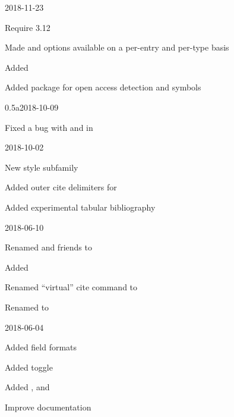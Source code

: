 \documentclass[DIV=9]{scrartcl}
\begin{document}
\begin{changelog}
\begin{release}{0.6}{2018-11-23}
  \item Require  3.12
  \item Made  and  options available on a
    per-entry and per-type basis
  \item Added 
  \item Added  package for open access detection and
    symbols
\end{release}
\begin{release}{0.5a}{2018-10-09}
  \item Fixed a bug with  and  in
\end{release}
\begin{release}{0.5}{2018-10-02}
  \item New  style
    subfamily
  \item Added outer cite delimiters for 
  \item Added experimental tabular bibliography
\end{release}
\begin{release}{0.4}{2018-06-10}
  \item Renamed  and friends to
  \item Added 
  \item Renamed \enquote{virtual} cite command  to
  \item Renamed  to 
\end{release}
\begin{release}{0.3}{2018-06-04}
  \item Added 
    field formats
  \item Added  toggle%
  \item Added ,  and
  \item Improve documentation

\end{release}
\end{changelog}
\end{document}

